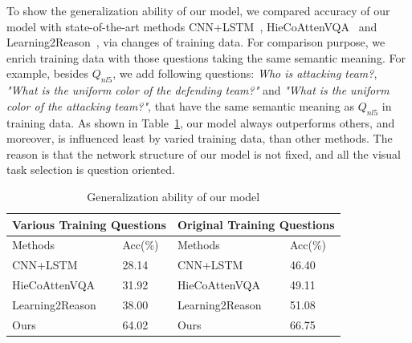 To show the generalization ability of our model, we compared accuracy of our model with state-of-the-art methods CNN+LSTM~\cite{VQA}, HieCoAttenVQA~\cite{Lu2016Hie} and Learning2Reason~\cite{hu2017learning}, via changes of training data. For comparison purpose, we enrich training data with those questions taking the same semantic meaning. For example, besides $Q_{nl5}$, we add following questions: \textit{Who is attacking team?}, \textit{"What is the uniform color of the defending team?"} and \textit{"What is the uniform color of the attacking team?"}, that have the same semantic meaning as $Q_{nl5}$ in training data. As shown in Table~\ref{table:genralization}, our model always outperforms others, and moreover, is influenced least by varied training data, than other methods. The reason is that the network structure of our model is not fixed, and all the visual task selection is question oriented.


\begin{table}[h]
	\small
	\begin{tabular}{|l|l||l|l|}
		\hline
		\multicolumn{2}{|l||}{Various Training Questions} & \multicolumn{2}{l|}{Original Training Questions} \\ \hline \hline
		Methods                  & Acc(\%)            & Methods                   & Acc(\%)             \\ \hline
		CNN+LSTM                    & 28.14              & CNN+LSTM                     & 46.40               \\ \hline
		HieCoAttenVQA               & 31.92              & HieCoAttenVQA                & 49.11               \\ \hline
		Learning2Reason             & 38.00              & Learning2Reason              & 51.08               \\ \hline
		Ours                        & 64.02              & Ours                         & 66.75               \\ \hline
	\end{tabular}
	\caption{Generalization ability of our model} \label{table:genralization}
\end{table}


